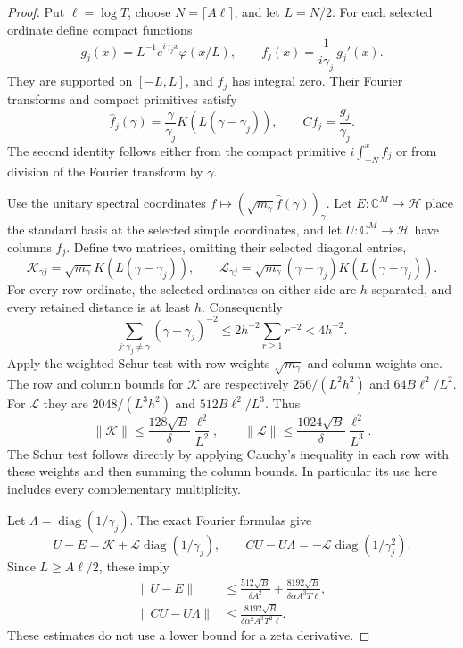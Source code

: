 \begin{proof}
Put \(\ell=\log T\), choose \(N=\lceil A\ell\rceil\), and
let \(L=N/2\). For each selected ordinate define compact functions
\[
 g_j(x)=L^{-1}e^{i\gamma_jx}\varphi(x/L),\qquad
 f_j(x)=\frac1{i\gamma_j}\,g_j'(x).
\]
They are supported on \([-L,L]\), and \(f_j\) has integral zero.
Their Fourier transforms and compact primitives satisfy
\[
 \widehat f_j(\gamma)
    =\frac{\gamma}{\gamma_j}K(L(\gamma-\gamma_j)),
 \qquad C f_j=\frac{g_j}{\gamma_j}.
\]
The second identity follows either from the compact primitive
\(i\int_{-N}^x f_j\) or from division of the Fourier transform by
\(\gamma\).

Use the unitary spectral coordinates
\(f\mapsto(\sqrt{m_\gamma}\widehat f(\gamma))_\gamma\).
Let \(E:\mathbb C^M\to\mathcal H\) place the standard basis
at the selected simple coordinates, and let
\(U:\mathbb C^M\to\mathcal H\) have columns \(f_j\).
Define two matrices, omitting their selected diagonal entries,
\[
 \mathcal K_{\gamma j}=\sqrt{m_\gamma}
       K(L(\gamma-\gamma_j)),\qquad
 \mathcal L_{\gamma j}=\sqrt{m_\gamma}
       (\gamma-\gamma_j)K(L(\gamma-\gamma_j)).
\]
For every row ordinate, the selected ordinates on either side are
\(h\)-separated, and every retained distance is at least \(h\).
Consequently
\[
 \sum_{j:\gamma_j\ne\gamma}(\gamma-\gamma_j)^{-2}
       \le2h^{-2}\sum_{r\ge1}r^{-2}<4h^{-2}.
\]
Apply the weighted Schur test with row weights
\(\sqrt{m_\gamma}\) and column weights one. The row and column
bounds for \(\mathcal K\) are respectively
\(256/(L^2h^2)\) and \(64B\ell^2/L^2\). For
\(\mathcal L\) they are \(2048/(L^3h^2)\) and
\(512B\ell^2/L^3\). Thus
\begin{equation}\label{eq:fd-bump-matrix-bounds}
 \|\mathcal K\|\le\frac{128\sqrt B}{\delta}
                 \frac{\ell^2}{L^2},\qquad
 \|\mathcal L\|\le\frac{1024\sqrt B}{\delta}
                 \frac{\ell^2}{L^3}.
\end{equation}
The Schur test follows directly by applying Cauchy's inequality in
each row with these weights and then summing the column bounds.
In particular its use here includes every complementary multiplicity.

Let \(\Lambda=\operatorname{diag}(1/\gamma_j)\). The exact
Fourier formulas give
\[
 U-E=\mathcal K+\mathcal L\operatorname{diag}(1/\gamma_j),
 \qquad C U-U\Lambda
       =-\mathcal L\operatorname{diag}(1/\gamma_j^2).
\]
Since \(L\ge A\ell/2\), these imply
\begin{align}
 \|U-E\|&\le\frac{512\sqrt B}{\delta A^2}
       +\frac{8192\sqrt B}{\delta\alpha A^3T\ell},
       \label{eq:fd-bump-isometry}\\
 \|CU-U\Lambda\|&\le
       \frac{8192\sqrt B}{\delta\alpha^2A^3T^2\ell}.
       \label{eq:fd-bump-residual}
\end{align}
These estimates do not use a lower bound for a zeta derivative.


\end{proof}
